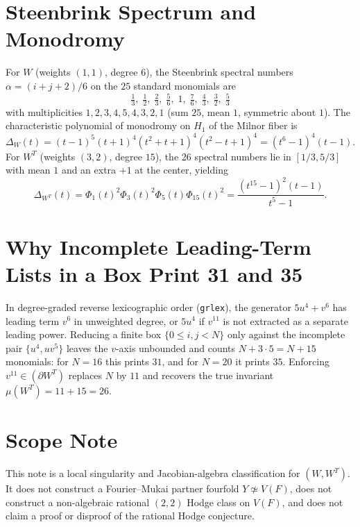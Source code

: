 \documentclass[11pt]{amsart}
\begin{document}
\section{Steenbrink Spectrum and Monodromy}

For $W$ (weights $(1,1)$, degree $6$), the Steenbrink spectral numbers $\alpha=(i+j+2)/6$ on the $25$ standard monomials are
\[
  \tfrac{1}{3},\;\tfrac{1}{2},\;\tfrac{2}{3},\;\tfrac{5}{6},\;1,\;\tfrac{7}{6},\;\tfrac{4}{3},\;\tfrac{3}{2},\;\tfrac{5}{3}
\]
with multiplicities $1,2,3,4,5,4,3,2,1$ (sum $25$, mean $1$, symmetric about $1$). The characteristic polynomial of monodromy on $H_1$ of the Milnor fiber is
\[
  \Delta_W(t)=(t-1)^5(t+1)^4(t^2+t+1)^4(t^2-t+1)^4=(t^6-1)^4(t-1).
\]
For $W^T$ (weights $(3,2)$, degree $15$), the $26$ spectral numbers lie in $[1/3,5/3]$ with mean $1$ and an extra $+1$ at the center, yielding
\[
  \Delta_{W^T}(t)=\Phi_1(t)^2\Phi_3(t)^2\Phi_5(t)\Phi_{15}(t)^2=\frac{(t^{15}-1)^2(t-1)}{t^5-1}.
\]

\section{Why Incomplete Leading-Term Lists in a Box Print 31 and 35}

In degree-graded reverse lexicographic order (\texttt{grlex}), the generator $5u^4+v^6$ has leading term $v^6$ in unweighted degree, or $5u^4$ if $v^{11}$ is not extracted as a separate leading power. Reducing a finite box $\{0\le i,j<N\}$ only against the incomplete pair $\{u^4,uv^5\}$ leaves the $v$-axis unbounded and counts $N+3\cdot 5=N+15$ monomials: for $N=16$ this prints $31$, and for $N=20$ it prints $35$. Enforcing $v^{11}\in(\partial W^T)$ replaces $N$ by $11$ and recovers the true invariant $\mu(W^T)=11+15=26$.

\section{Scope Note}

This note is a local singularity and Jacobian-algebra classification for $(W,W^T)$. It does not construct a Fourier--Mukai partner fourfold $Y\not\simeq V(F)$, does not construct a non-algebraic rational $(2,2)$ Hodge class on $V(F)$, and does not claim a proof or disproof of the rational Hodge conjecture.
\end{document}

